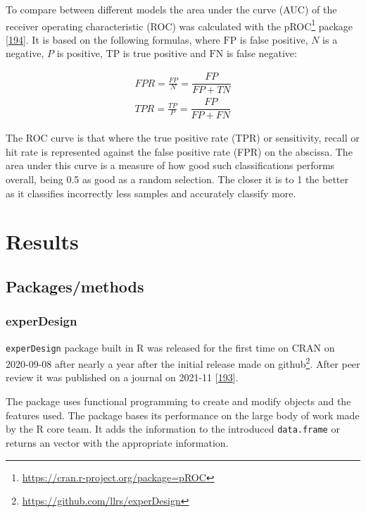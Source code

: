 \documentclass[
  a4paper,
]{book}
\DeclareRobustCommand{\href}[2]{#2\footnote{\url{#1}}}
\begin{document}
To compare between different models the area under the curve (AUC) of the receiver operating characteristic (ROC) was calculated with the \href{https://cran.r-project.org/package=pROC}{pROC} package {[}\protect\hyperlink{ref-robin2011}{194}{]}.
It is based on the following formulas, where \(\text{FP}\) is false positive, \(N\) is a negative, \(P\) is positive, \(\text{TP}\) is true positive and \(\text{FN}\) is false negative:

\[
\begin{aligned}
FPR = \frac{FP}{N} = \dfrac{FP}{FP+TN} \\
TPR = \frac{TP}{P} = \dfrac{FP}{FP+FN} 
\end{aligned}
\]

The ROC curve is that where the true positive rate (TPR) or sensitivity, recall or hit rate is represented against the false positive rate (FPR) on the abscissa.
The area under this curve is a measure of how good such classifications performs overall, being 0.5 as good as a random selection.
The closer it is to 1 the better as it classifies incorrectly less samples and accurately classify more.

\hypertarget{results}{%
\chapter{Results}\label{results}}

\hypertarget{packagesmethods}{%
\section{Packages/methods}\label{packagesmethods}}

\hypertarget{experdesign-1}{%
\subsection{experDesign}\label{experdesign-1}}

\texttt{experDesign} package built in R was released for the first time on CRAN on 2020-09-08 after nearly a year after the initial release made on \href{https://github.com/llrs/experDesign}{github}.
After peer review it was published on a journal on 2021-11 {[}\protect\hyperlink{ref-revillasancho2021}{193}{]}.

The package uses functional programming to create and modify objects and the features used.
The package bases its performance on the large body of work made by the R core team.
It adds the information to the introduced \texttt{data.frame} or returns an vector with the appropriate information.
\end{document}
